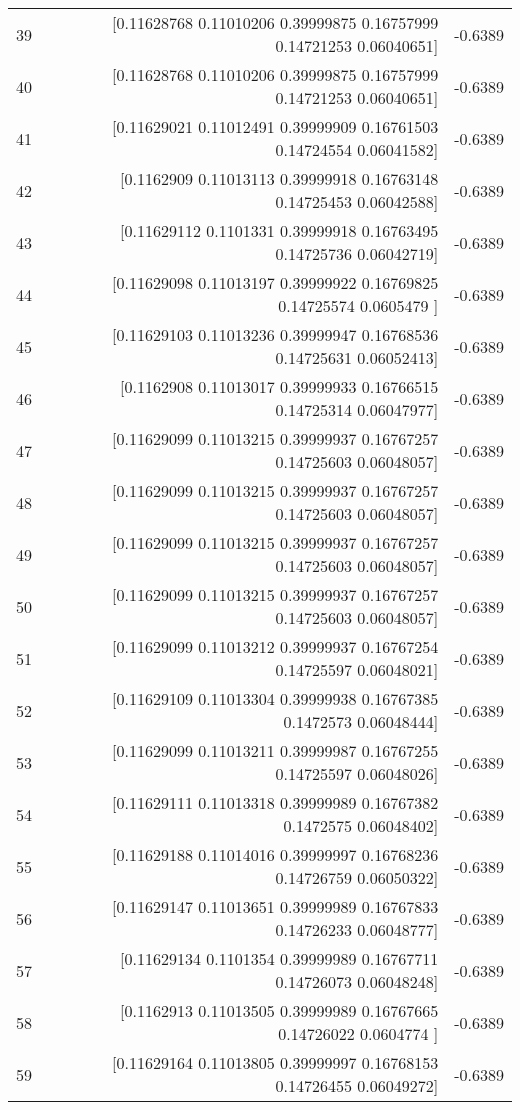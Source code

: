 \begin{longtable}{lrr}
39 & [0.11628768 0.11010206 0.39999875 0.16757999 0.14721253 0.06040651] & -0.6389 \\
40 & [0.11628768 0.11010206 0.39999875 0.16757999 0.14721253 0.06040651] & -0.6389 \\
41 & [0.11629021 0.11012491 0.39999909 0.16761503 0.14724554 0.06041582] & -0.6389 \\
42 & [0.1162909  0.11013113 0.39999918 0.16763148 0.14725453 0.06042588] & -0.6389 \\
43 & [0.11629112 0.1101331  0.39999918 0.16763495 0.14725736 0.06042719] & -0.6389 \\
44 & [0.11629098 0.11013197 0.39999922 0.16769825 0.14725574 0.0605479 ] & -0.6389 \\
45 & [0.11629103 0.11013236 0.39999947 0.16768536 0.14725631 0.06052413] & -0.6389 \\
46 & [0.1162908  0.11013017 0.39999933 0.16766515 0.14725314 0.06047977] & -0.6389 \\
47 & [0.11629099 0.11013215 0.39999937 0.16767257 0.14725603 0.06048057] & -0.6389 \\
48 & [0.11629099 0.11013215 0.39999937 0.16767257 0.14725603 0.06048057] & -0.6389 \\
49 & [0.11629099 0.11013215 0.39999937 0.16767257 0.14725603 0.06048057] & -0.6389 \\
50 & [0.11629099 0.11013215 0.39999937 0.16767257 0.14725603 0.06048057] & -0.6389 \\
51 & [0.11629099 0.11013212 0.39999937 0.16767254 0.14725597 0.06048021] & -0.6389 \\
52 & [0.11629109 0.11013304 0.39999938 0.16767385 0.1472573  0.06048444] & -0.6389 \\
53 & [0.11629099 0.11013211 0.39999987 0.16767255 0.14725597 0.06048026] & -0.6389 \\
54 & [0.11629111 0.11013318 0.39999989 0.16767382 0.1472575  0.06048402] & -0.6389 \\
55 & [0.11629188 0.11014016 0.39999997 0.16768236 0.14726759 0.06050322] & -0.6389 \\
56 & [0.11629147 0.11013651 0.39999989 0.16767833 0.14726233 0.06048777] & -0.6389 \\
57 & [0.11629134 0.1101354  0.39999989 0.16767711 0.14726073 0.06048248] & -0.6389 \\
58 & [0.1162913  0.11013505 0.39999989 0.16767665 0.14726022 0.0604774 ] & -0.6389 \\
59 & [0.11629164 0.11013805 0.39999997 0.16768153 0.14726455 0.06049272] & -0.6389 \\

\end{longtable}
